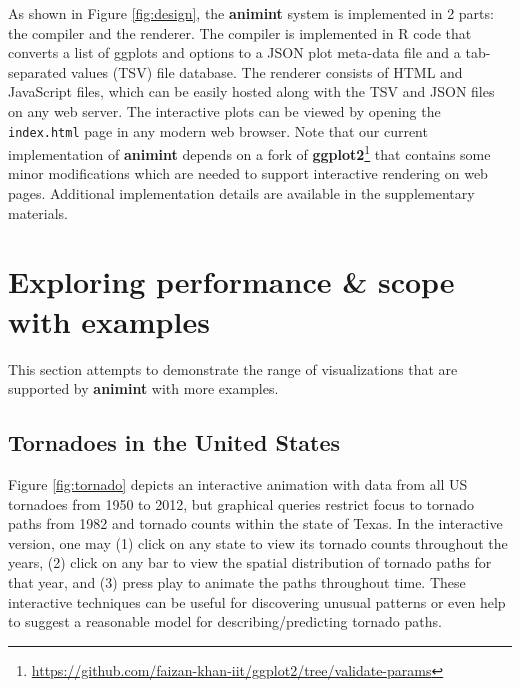 \documentclass[12pt,]{article}
\let\rmarkdownfootnote\footnote%
\def\footnote{\protect\rmarkdownfootnote}
\theoremstyle{definition}
\theoremstyle{definition}
\theoremstyle{definition}
\theoremstyle{remark}
\begin{document}
As shown in Figure \ref{fig:design}, the \textbf{animint} system is
implemented in 2 parts: the compiler and the renderer. The compiler is
implemented in R code that converts a list of ggplots and options to a
JSON plot meta-data file and a tab-separated values (TSV) file database.
The renderer consists of HTML and JavaScript files, which can be easily
hosted along with the TSV and JSON files on any web server. The
interactive plots can be viewed by opening the \texttt{index.html} page
in any modern web browser. Note that our current implementation of
\textbf{animint} depends on a fork of
\textbf{ggplot2}\footnote{\url{https://github.com/faizan-khan-iit/ggplot2/tree/validate-params}}
that contains some minor modifications which are needed to support
interactive rendering on web pages. Additional implementation details
are available in the supplementary materials.

\hypertarget{performance}{%
\section{Exploring performance \& scope with
examples}\label{performance}}

This section attempts to demonstrate the range of visualizations that
are supported by \textbf{animint} with more examples.

\hypertarget{tornadoes-in-the-united-states}{%
\subsection{Tornadoes in the United
States}\label{tornadoes-in-the-united-states}}

Figure \ref{fig:tornado} depicts an interactive animation with data from
all US tornadoes from 1950 to 2012, but graphical queries restrict focus
to tornado paths from 1982 and tornado counts within the state of Texas.
In the interactive version, one may (1) click on any state to view its
tornado counts throughout the years, (2) click on any bar to view the
spatial distribution of tornado paths for that year, and (3) press play
to animate the paths throughout time. These interactive techniques can
be useful for discovering unusual patterns or even help to suggest a
reasonable model for describing/predicting tornado paths.
\end{document}
